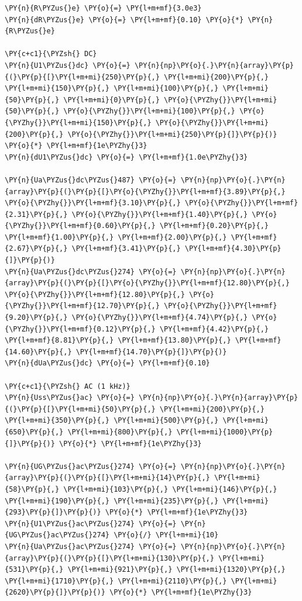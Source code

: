     \begin{tcolorbox}[breakable, size=fbox, boxrule=1pt, pad at break*=1mm,colback=cellbackground, colframe=cellborder]
\begin{Verbatim}[commandchars=\\\{\}]
\PY{n}{R\PYZus{}e} \PY{o}{=} \PY{l+m+mf}{3.0e3}
\PY{n}{dR\PYZus{}e} \PY{o}{=} \PY{l+m+mf}{0.10} \PY{o}{*} \PY{n}{R\PYZus{}e}

\PY{c+c1}{\PYZsh{} DC}
\PY{n}{U1\PYZus{}dc} \PY{o}{=} \PY{n}{np}\PY{o}{.}\PY{n}{array}\PY{p}{(}\PY{p}{[}\PY{l+m+mi}{250}\PY{p}{,} \PY{l+m+mi}{200}\PY{p}{,} \PY{l+m+mi}{150}\PY{p}{,} \PY{l+m+mi}{100}\PY{p}{,} \PY{l+m+mi}{50}\PY{p}{,} \PY{l+m+mi}{0}\PY{p}{,} \PY{o}{\PYZhy{}}\PY{l+m+mi}{50}\PY{p}{,} \PY{o}{\PYZhy{}}\PY{l+m+mi}{100}\PY{p}{,} \PY{o}{\PYZhy{}}\PY{l+m+mi}{150}\PY{p}{,} \PY{o}{\PYZhy{}}\PY{l+m+mi}{200}\PY{p}{,} \PY{o}{\PYZhy{}}\PY{l+m+mi}{250}\PY{p}{]}\PY{p}{)} \PY{o}{*} \PY{l+m+mf}{1e\PYZhy{}3}
\PY{n}{dU1\PYZus{}dc} \PY{o}{=} \PY{l+m+mf}{1.0e\PYZhy{}3}

\PY{n}{Ua\PYZus{}dc\PYZus{}487} \PY{o}{=} \PY{n}{np}\PY{o}{.}\PY{n}{array}\PY{p}{(}\PY{p}{[}\PY{o}{\PYZhy{}}\PY{l+m+mf}{3.89}\PY{p}{,} \PY{o}{\PYZhy{}}\PY{l+m+mf}{3.10}\PY{p}{,} \PY{o}{\PYZhy{}}\PY{l+m+mf}{2.31}\PY{p}{,} \PY{o}{\PYZhy{}}\PY{l+m+mf}{1.40}\PY{p}{,} \PY{o}{\PYZhy{}}\PY{l+m+mf}{0.60}\PY{p}{,} \PY{l+m+mf}{0.20}\PY{p}{,} \PY{l+m+mf}{1.00}\PY{p}{,} \PY{l+m+mf}{2.00}\PY{p}{,} \PY{l+m+mf}{2.67}\PY{p}{,} \PY{l+m+mf}{3.41}\PY{p}{,} \PY{l+m+mf}{4.30}\PY{p}{]}\PY{p}{)}
\PY{n}{Ua\PYZus{}dc\PYZus{}274} \PY{o}{=} \PY{n}{np}\PY{o}{.}\PY{n}{array}\PY{p}{(}\PY{p}{[}\PY{o}{\PYZhy{}}\PY{l+m+mf}{12.80}\PY{p}{,} \PY{o}{\PYZhy{}}\PY{l+m+mf}{12.80}\PY{p}{,} \PY{o}{\PYZhy{}}\PY{l+m+mf}{12.70}\PY{p}{,} \PY{o}{\PYZhy{}}\PY{l+m+mf}{9.20}\PY{p}{,} \PY{o}{\PYZhy{}}\PY{l+m+mf}{4.74}\PY{p}{,} \PY{o}{\PYZhy{}}\PY{l+m+mf}{0.12}\PY{p}{,} \PY{l+m+mf}{4.42}\PY{p}{,} \PY{l+m+mf}{8.81}\PY{p}{,} \PY{l+m+mf}{13.80}\PY{p}{,} \PY{l+m+mf}{14.60}\PY{p}{,} \PY{l+m+mf}{14.70}\PY{p}{]}\PY{p}{)}
\PY{n}{dUa\PYZus{}dc} \PY{o}{=} \PY{l+m+mf}{0.10}

\PY{c+c1}{\PYZsh{} AC (1 kHz)}
\PY{n}{Uss\PYZus{}ac} \PY{o}{=} \PY{n}{np}\PY{o}{.}\PY{n}{array}\PY{p}{(}\PY{p}{[}\PY{l+m+mi}{50}\PY{p}{,} \PY{l+m+mi}{200}\PY{p}{,} \PY{l+m+mi}{350}\PY{p}{,} \PY{l+m+mi}{500}\PY{p}{,} \PY{l+m+mi}{650}\PY{p}{,} \PY{l+m+mi}{800}\PY{p}{,} \PY{l+m+mi}{1000}\PY{p}{]}\PY{p}{)} \PY{o}{*} \PY{l+m+mf}{1e\PYZhy{}3}

\PY{n}{UG\PYZus{}ac\PYZus{}274} \PY{o}{=} \PY{n}{np}\PY{o}{.}\PY{n}{array}\PY{p}{(}\PY{p}{[}\PY{l+m+mi}{14}\PY{p}{,} \PY{l+m+mi}{58}\PY{p}{,} \PY{l+m+mi}{103}\PY{p}{,} \PY{l+m+mi}{146}\PY{p}{,} \PY{l+m+mi}{190}\PY{p}{,} \PY{l+m+mi}{235}\PY{p}{,} \PY{l+m+mi}{293}\PY{p}{]}\PY{p}{)} \PY{o}{*} \PY{l+m+mf}{1e\PYZhy{}3}
\PY{n}{U1\PYZus{}ac\PYZus{}274} \PY{o}{=} \PY{n}{UG\PYZus{}ac\PYZus{}274} \PY{o}{/} \PY{l+m+mi}{10}
\PY{n}{Ua\PYZus{}ac\PYZus{}274} \PY{o}{=} \PY{n}{np}\PY{o}{.}\PY{n}{array}\PY{p}{(}\PY{p}{[}\PY{l+m+mi}{130}\PY{p}{,} \PY{l+m+mi}{531}\PY{p}{,} \PY{l+m+mi}{921}\PY{p}{,} \PY{l+m+mi}{1320}\PY{p}{,} \PY{l+m+mi}{1710}\PY{p}{,} \PY{l+m+mi}{2110}\PY{p}{,} \PY{l+m+mi}{2620}\PY{p}{]}\PY{p}{)} \PY{o}{*} \PY{l+m+mf}{1e\PYZhy{}3}


\end{Verbatim}
\end{tcolorbox}
